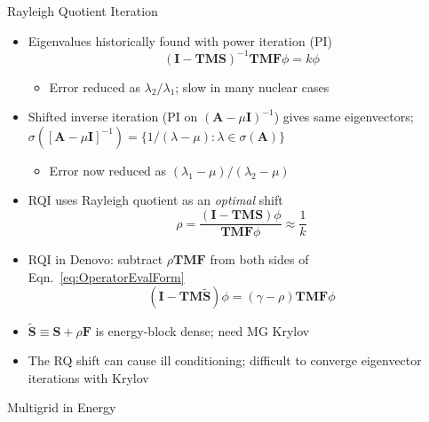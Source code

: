 \documentclass[final]{beamer}
\newcommand{\ve}[1]{\ensuremath{\mathbf{#1}}}
\begin{document}
\begin{frame}{}
\begin{columns}[t]
    \begin{column}{.3\linewidth}
    \begin{block}{Rayleigh Quotient Iteration \cite{Slaybaugh2012}}
	\begin{itemize}
	\item{Eigenvalues historically found with power iteration (PI)}
	\begin{equation}
	(\ve{I} - \ve{TMS})^{-1} \ve{TMF} \phi = k\phi
	\end{equation}
	\vspace*{-1em}
		\begin{itemize}
		\item{Error reduced as $\lambda_{2}/\lambda_{1}$; slow in many nuclear cases}
		\end{itemize}
		\vspace*{0.2 em}
	\item{Shifted inverse iteration (PI on $(\ve{A} - \mu \ve{I})^{-1}$) gives same eigenvectors; $\sigma([\ve{A} - \mu \ve{I}]^{-1}) = \{1/(\lambda - \mu):\lambda \in \sigma(\ve{A})\}$ }
		\vspace*{0.1 em}
		\begin{itemize}
		\item{Error now reduced as $(\lambda_{1}-\mu)/(\lambda_{2}-\mu)$}
		\end{itemize}		
		\vspace*{0.1 em}
	\item{RQI uses Rayleigh quotient as an \textit{optimal} shift}
		\begin{equation}
          \rho = \frac{(\ve{I} - \ve{TMS})\phi}{\ve{TMF} \phi} \approx \frac{1}{k}
		\end{equation}
		\item{RQI in Denovo: subtract $\rho \ve{TMF}$ from both sides of 
		 Eqn.\ \eqref{eq:OperatorEvalForm}}
        \begin{equation}
          (\ve{I} - \ve{TM}\ve{\tilde{S}})\phi =( \gamma - \rho) \ve{TMF} \phi 
          \label{eq:OperatorShiftedEval} 
        \end{equation}
		\item{$\ve{\tilde{S}} \equiv \ve{S} + \rho\ve{F}$ is energy-block dense;
		 need MG Krylov}
		\item{The RQ shift can cause ill conditioning; difficult to converge
		 eigenvector iterations with Krylov}
	\end{itemize}
            \end{block}
		\vfill
        	\begin{block}{\large Multigrid in Energy \cite{Slaybaugh2013}}

\end{block}
\end{column}
\end{columns}
\end{frame}
\end{document}
